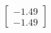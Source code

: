 \documentclass[preview]{standalone}
\begin{document}
\begin{align*}
\begin{bmatrix} -1.49 \\ -1.49 \end{bmatrix}
\end{align*}
\end{document}
